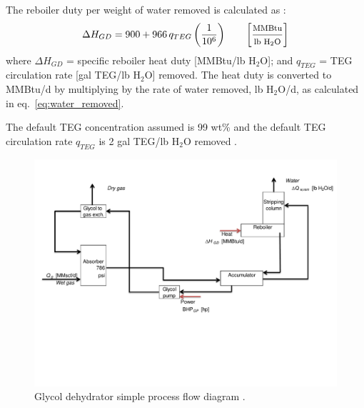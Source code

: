 \documentclass[11pt]{report}
\newcommand{\marg}[1]{{\footnotesize\textit{\textcolor{stanford}{'#1'}}}}
\newcommand{\marginnote}[1]{\marginpar{\marg{#1}}}
\begin{document}
The reboiler duty per weight of water removed is calculated as \cite[p. 158]{Manning1991}: \marginnote{Surface \\ Processing 2.2.2.2.1}
\begin{equation} \label{eq:gas_dehyd_heat}
\Delta H_{GD}= 900+966\,q_{TEG} \left( \frac{1}{10^6} \right) \quad\quad \begin{footnotesize}\left[ \frac{\text{MMBtu}}{\text{lb H$_{2}$O}} \right] \end{footnotesize}
\end{equation}
where $\Delta H_{GD}$ = specific reboiler heat duty [MMBtu/lb H$_{2}$O]; and $q_{TEG}$ = TEG circulation rate [gal TEG/lb H$_{2}$O] removed. The heat duty is converted to MMBtu/d by multiplying by the rate of water removed, lb H$_{2}$O/d, as calculated in eq.\ \eqref{eq:water_removed}.

The default TEG concentration assumed is 99 wt\% \cite[p. 155]{Manning1991} and the default TEG circulation rate $q_{TEG}$ is 2 gal TEG/lb H$_{2}$O removed \cite[p. 147]{Manning1991}.

\begin{landscape}
\begin{figure}[t]
\includegraphics[width=0.85\columnwidth]{images/glycol_dehydrator_process.pdf}
\caption{Glycol dehydrator simple process flow diagram \cite[p. 141]{Manning1991}.}
\label{fig:glycol_dehydrator_process}
\end{figure}
\end{landscape}
\end{document}
